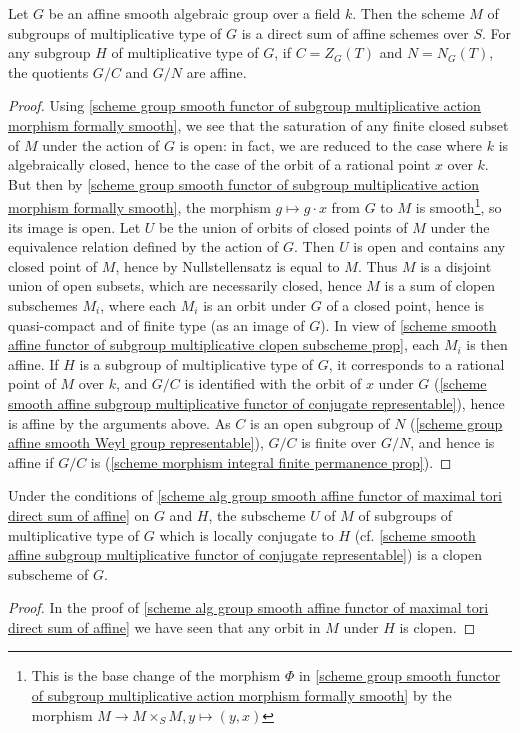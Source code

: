 \begin{corollary}\label{scheme alg group smooth affine functor of maximal tori direct sum of affine}
Let $G$ be an affine smooth algebraic group over a field $k$. Then the scheme $M$ of subgroups of multiplicative type of $G$ is a direct sum of affine schemes over $S$. For any subgroup $H$ of multiplicative type of $G$, if $C=Z_G(T)$ and $N=N_G(T)$, the quotients $G/C$ and $G/N$ are affine. 
\end{corollary}
\begin{proof}
Using \cref{scheme group smooth functor of subgroup multiplicative action morphism formally smooth}, we see that the saturation of any finite closed subset of $M$ under the action of $G$ is open: in fact, we are reduced to the case where $k$ is algebraically closed, hence to the case of the orbit of a rational point $x$ over $k$. But then by \cref{scheme group smooth functor of subgroup multiplicative action morphism formally smooth}, the morphism $g\mapsto g\cdot x$ from $G$ to $M$ is smooth\footnote{This is the base change of the morphism $\Phi$ in \cref{scheme group smooth functor of subgroup multiplicative action morphism formally smooth} by the morphism $M\to M\times_SM,y\mapsto(y,x)$}, so its image is open. Let $U$ be the union of orbits of closed points of $M$ under the equivalence relation defined by the action of $G$. Then $U$ is open and contains any closed point of $M$, hence by Nullstellensatz is equal to $M$. Thus $M$ is a disjoint union of open subsets, which are necessarily closed, hence $M$ is a sum of clopen subschemes $M_i$, where each $M_i$ is an orbit under $G$ of a closed point, hence is quasi-compact and of finite type (as an image of $G$). In view of \cref{scheme smooth affine functor of subgroup multiplicative clopen subscheme prop}, each $M_i$ is then affine. If $H$ is a subgroup of multiplicative type of $G$, it corresponds to a rational point of $M$ over $k$, and $G/C$ is identified with the orbit of $x$ under $G$ (\cref{scheme smooth affine subgroup multiplicative functor of conjugate representable}), hence is affine by the arguments above. As $C$ is an open subgroup of $N$ (\cref{scheme group affine smooth Weyl group representable}), $G/C$ is finite over $G/N$, and hence is affine if $G/C$ is (\cref{scheme morphism integral finite permanence prop}).
\end{proof}

\begin{corollary}\label{scheme alg group smooth affine subgroup multiplicative functor of conjugate clopen}
Under the conditions of \cref{scheme alg group smooth affine functor of maximal tori direct sum of affine} on $G$ and $H$, the subscheme $U$ of $M$ of subgroups of multiplicative type of $G$ which is locally conjugate to $H$ (cf. \cref{scheme smooth affine subgroup multiplicative functor of conjugate representable}) is a clopen subscheme of $G$.
\end{corollary}
\begin{proof}
In the proof of \cref{scheme alg group smooth affine functor of maximal tori direct sum of affine} we have seen that any orbit in $M$ under $H$ is clopen.
\end{proof}

